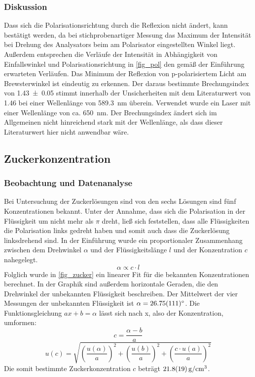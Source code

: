 \documentclass[
	a4paper,
	12pt,
	pagesize,
	ngerman
]{scrartcl}
\begin{document}
	\subsubsection{Diskussion}
	Dass sich die Polarisationsrichtung durch die Reflexion nicht ändert, kann bestätigt werden, da bei stichprobenartiger Messung das Maximum der Intensität bei Drehung des Analysators beim am Polarisator eingestellten Winkel liegt.
	Außerdem entsprechen die Verläufe der Intensität in Abhängigkeit von Einfallswinkel und Polarisationsrichtung in \cref{fig_pol} den gemäß der Einführung erwarteten Verläufen.
	Das Minimum der Reflexion von p-polarisiertem Licht am Brewsterwinkel ist eindeutig zu erkennen.
	Der daraus bestimmte Brechungsindex von \SI{1,43 \pm 0,05}{} stimmt innerhalb der Unsicherheiten mit dem Literaturwert von \SI{1,46}{} bei einer Wellenlänge von \SI{589,3}{nm} überein. \cite{quarz_brech}
	Verwendet wurde ein Laser mit einer Wellenlänge von ca. \SI{650}{\nano \meter}.
	Der Brechungsindex ändert sich im Allgemeinen nicht hinreichend stark mit der Wellenlänge, als dass dieser Literaturwert hier nicht anwendbar wäre.

	\subsection{Zuckerkonzentration}
	\subsubsection{Beobachtung und Datenanalyse}
	Bei Untersuchung der Zuckerlösungen sind von den sechs Lösungen sind fünf Konzentrationen bekannt.
	Unter der Annahme, dass sich die Polarisation in der Flüssigkeit um nicht mehr als $\pi$ dreht, ließ sich feststellen, dass alle Flüssigkeiten die Polarisation links gedreht haben und somit auch dass die Zuckerlösung linksdrehend sind.
	In der Einführung wurde ein proportionaler Zusammenhang zwischen dem Drehwinkel $\alpha$ und der Flüssigkeitslänge $l$ und der Konzentration $c$ nahegelegt.
	\begin{equation}
		\alpha \propto c \cdot l
	\end{equation}
	Folglich wurde in \cref{fig_zucker} ein linearer Fit für die bekannten Konzentrationen berechnet.
	In der Graphik sind außerdem horizontale Geraden, die den Drehwinkel der unbekannten Flüssigkeit beschreiben.
	Der Mittelwert der vier Messungen der unbekannten Flüssigkeit ist $\alpha=\SI{26,75+-1,11}{\degree}$.
	Die Funktionsgleichung $ax+b=\alpha$ lässt sich nach x, also der Konzentration, umformen:
	\begin{equation}
		c = \frac{\alpha-b}{a}
	\end{equation}
	\begin{equation}
		u(c) = \sqrt{ \left(\frac{u(\alpha)}{a}\right)^2 + \left(\frac{u(b)}{a}\right)^2 + \left(\frac{c \cdot u(a)}{a}\right)^2}
	\end{equation}
	Die somit bestimmte Zuckerkonzentration $c$ beträgt $\SI{21,8+-1,9}{g/cm^3}$.
\end{document}
